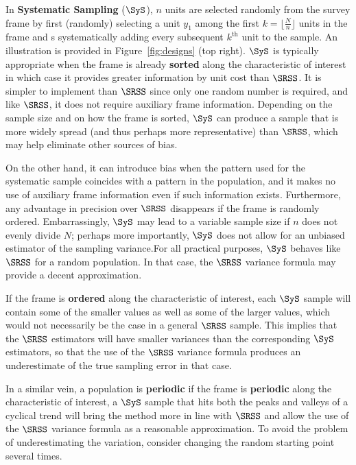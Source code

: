 In \textbf{Systematic Sampling} ($\SyS$), $n$ units are selected randomly from the survey frame by first (randomly) selecting a unit $y_1$ among the first $k=\lfloor\frac{N}{n}\rfloor$ units in the frame and s systematically adding every subsequent $k^{\textrm{th}}$ unit to the sample. An illustration is provided in Figure~\ref{fig:designs} (top right). \newl $\SyS$ is typically appropriate when the frame is already \textbf{sorted} along the characteristic of interest in which case it provides greater information by unit cost than $\SRSS$. It is simpler to implement than $\SRSS$ since only one random number is required, and like $\SRSS$, it does not require auxiliary frame information. Depending on the sample size and on how the frame is sorted, $\SyS$ can produce a sample that is more widely spread (and thus perhaps more representative) than $\SRSS$, which may help eliminate other sources of bias.\par On the other hand, it can introduce bias when the pattern used for the systematic sample coincides with a pattern in the population, and it makes no use of auxiliary frame information even if such information exists. Furthermore, any advantage in precision over $\SRSS$ disappears if the frame is randomly ordered. Embarrassingly, $\SyS$ may lead to a variable sample size if $n$ does not evenly divide $N$; perhaps more importantly, $\SyS$ does not allow for an unbiased estimator of the sampling variance.\newl For all practical purposes, $\SyS$ behaves like $\SRSS$ for a random population. In that case, the $\SRSS$ variance  formula may provide a decent approximation. 
\par If the frame is \textbf{ordered} along the characteristic of interest, each $\SyS$ sample will contain some of the smaller values as well as some of the larger values, which would not necessarily be the case in a general $\SRSS$ sample. This implies that the  $\SRSS$ estimators will have smaller variances than the corresponding $\SyS$ estimators, so that the use of the $\SRSS$ variance formula produces an underestimate of the true sampling error in that case. \par In a similar vein, a population is \textbf{periodic} if the frame is \textbf{periodic}  along the characteristic of interest, a $\SyS$ sample that hits both the peaks and valleys of a cyclical trend will bring the method more in line with $\SRSS$ and allow the use of the $\SRSS$ variance formula as a reasonable approximation. To avoid the problem of underestimating the variation, consider changing the random starting point several times.\newl 
